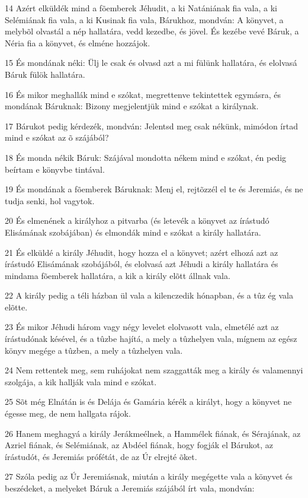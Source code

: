 \par 14 Azért elküldék mind a fõemberek Jéhudit, a ki Natániának fia vala, a ki Selémiának fia vala, a ki Kusinak fia vala, Bárukhoz, mondván: A könyvet, a melybõl olvastál a nép hallatára, vedd kezedbe, és jövel. És kezébe vevé Báruk, a Néria fia a könyvet, és elméne hozzájok.
\par 15 És mondának néki: Ülj le csak és olvasd azt a mi fülünk hallatára, és elolvasá Báruk fülök hallatára.
\par 16 És mikor meghallák mind e szókat, megrettenve tekintettek egymásra, és mondának Báruknak: Bizony megjelentjük mind e szókat a királynak.
\par 17 Bárukot pedig kérdezék, mondván: Jelentsd meg csak nékünk, mimódon írtad mind e szókat az õ szájából?
\par 18 És monda nékik Báruk: Szájával mondotta nékem mind e szókat, én pedig beírtam e könyvbe tintával.
\par 19 És mondának a fõemberek Báruknak: Menj el, rejtõzzél el te és Jeremiás, és ne tudja senki, hol vagytok.
\par 20 És elmenének a királyhoz a pitvarba (és letevék a könyvet az írástudó Elisámának szobájában) és elmondák mind e szókat a király hallatára.
\par 21 És elküldé a király Jéhudit, hogy hozza el a könyvet; azért elhozá azt az írástudó Elisámának szobájából, és elolvasá azt Jéhudi a király hallatára és mindama fõemberek hallatára, a kik a király elõtt állnak vala.
\par 22 A király pedig a téli házban ül vala a kilenczedik hónapban, és a tûz ég vala elõtte.
\par 23 És mikor Jéhudi három vagy négy levelet elolvasott vala, elmetélé azt az írástudónak késével, és a tûzbe hajítá, a mely a tûzhelyen vala, mígnem az egész könyv megége a tûzben, a mely a tûzhelyen vala.
\par 24 Nem rettentek meg, sem ruhájokat nem szaggatták meg a király és valamennyi szolgája, a kik hallják vala mind e szókat.
\par 25 Sõt még Elnátán is és Delája és Gamária kérék a királyt, hogy a könyvet ne égesse meg, de nem hallgata rájok.
\par 26 Hanem meghagyá a király Jerákmeélnek, a Hammélek fiának, és Sérajának, az Azriel fiának, és Selémiának, az Abdéel fiának, hogy fogják el Bárukot, az írástudót, és Jeremiás prófétát, de az Úr elrejté õket.
\par 27 Szóla pedig az Úr Jeremiásnak, miután a király megégette vala a könyvet és beszédeket, a melyeket Báruk a Jeremiás szájából írt vala, mondván:
